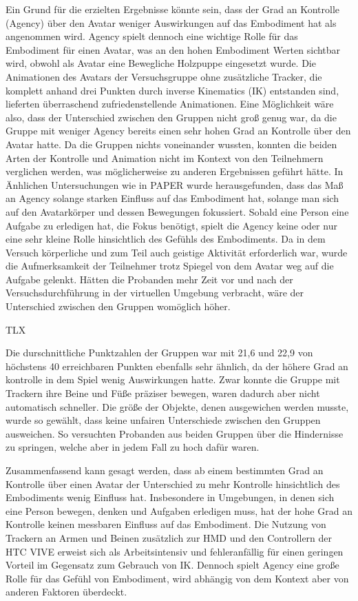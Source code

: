 Ein Grund für die erzielten Ergebnisse könnte sein, dass der Grad an Kontrolle (Agency) über den Avatar weniger Auswirkungen auf das Embodiment hat als angenommen wird. Agency spielt dennoch eine wichtige Rolle für das Embodiment für einen Avatar, was an den hohen Embodiment Werten sichtbar wird, obwohl als Avatar eine Bewegliche Holzpuppe eingesetzt wurde. Die Animationen des Avatars der Versuchsgruppe ohne zusätzliche Tracker, die komplett anhand drei Punkten durch inverse Kinematics (IK) entstanden sind, lieferten überraschend zufriedenstellende Animationen. Eine Möglichkeit wäre also, dass der Unterschied zwischen den Gruppen nicht groß genug war, da die Gruppe mit weniger Agency bereits einen sehr hohen Grad an Kontrolle über den Avatar hatte. Da die Gruppen nichts voneinander wussten, konnten die beiden Arten der Kontrolle und Animation nicht im Kontext von den Teilnehmern verglichen werden, was möglicherweise zu anderen Ergebnissen geführt hätte.
In Änhlichen Untersuchungen wie in PAPER wurde herausgefunden, dass das Maß an Agency solange starken Einfluss auf das Embodiment hat, solange man sich auf den Avatarkörper und dessen Bewegungen fokussiert. Sobald eine Person eine Aufgabe zu erledigen hat, die Fokus benötigt,  spielt die Agency keine oder nur eine sehr kleine Rolle hinsichtlich des Gefühls des Embodiments. Da in dem Versuch körperliche und zum Teil auch geistige Aktivität erforderlich war, wurde die Aufmerksamkeit der Teilnehmer trotz Spiegel von dem Avatar weg auf die Aufgabe gelenkt. Hätten die Probanden mehr Zeit vor und nach der Versuchsdurchführung in der virtuellen Umgebung verbracht, wäre der Unterschied zwischen den Gruppen womöglich höher.

TLX

Die durschnittliche Punktzahlen der Gruppen war mit 21,6 und 22,9 von höchstens 40 erreichbaren Punkten ebenfalls sehr ähnlich, da der höhere Grad an kontrolle in dem Spiel wenig Auswirkungen hatte. Zwar konnte die Gruppe mit Trackern ihre Beine und Füße präziser bewegen, waren dadurch aber nicht automatisch schneller. Die größe der Objekte, denen ausgewichen werden musste, wurde so gewählt, dass keine unfairen Unterschiede zwischen den Gruppen ausweichen. So versuchten Probanden aus beiden Gruppen über die Hindernisse zu springen, welche aber in jedem Fall zu hoch dafür waren.





Zusammenfassend kann gesagt werden, dass ab einem bestimmten Grad an Kontrolle über einen Avatar der Unterschied zu mehr Kontrolle hinsichtlich des Embodiments wenig Einfluss hat. Insbesondere in Umgebungen, in denen sich eine Person bewegen, denken und Aufgaben erledigen muss, hat der hohe Grad an Kontrolle keinen messbaren Einfluss auf das Embodiment. Die Nutzung von Trackern an Armen und Beinen zusätzlich zur HMD und den Controllern der HTC VIVE erweist sich als Arbeitsintensiv und fehleranfällig für einen geringen Vorteil im Gegensatz zum Gebrauch von IK. Dennoch spielt Agency eine große Rolle für das Gefühl von Embodiment, wird abhängig von dem Kontext aber von anderen Faktoren überdeckt.


